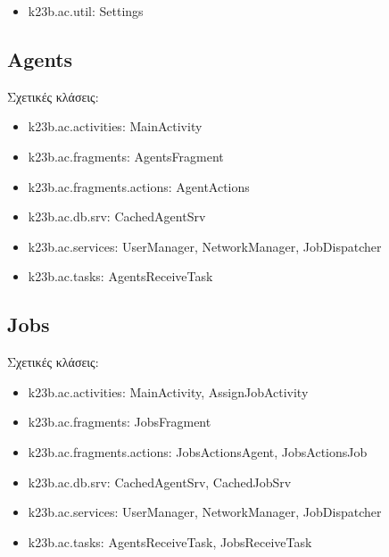 \documentclass[a4paper,11pt]{article}
\begin{document}
\begin{sloppypar}
\begin{itemize}
\item k23b.ac.util: Settings

\end{itemize}

\newpage

\subsection{Agents}

Σχετικές κλάσεις:

\begin{itemize}

\item k23b.ac.activities: MainActivity

\item k23b.ac.fragments: AgentsFragment

\item k23b.ac.fragments.actions: AgentActions

\item k23b.ac.db.srv: CachedAgentSrv

\item k23b.ac.services: UserManager, NetworkManager, JobDispatcher

\item k23b.ac.tasks: AgentsReceiveTask

\end{itemize}

\subsection{Jobs}

Σχετικές κλάσεις:

\begin{itemize}

\item k23b.ac.activities: MainActivity, AssignJobActivity

\item k23b.ac.fragments: JobsFragment

\item k23b.ac.fragments.actions: JobsActionsAgent, JobsActionsJob

\item k23b.ac.db.srv: CachedAgentSrv, CachedJobSrv

\item k23b.ac.services: UserManager, NetworkManager, JobDispatcher

\item k23b.ac.tasks: AgentsReceiveTask, JobsReceiveTask


\end{itemize}
\end{sloppypar}
\end{document}

